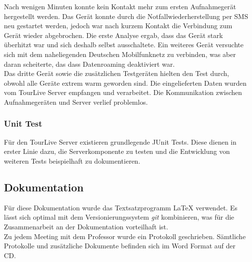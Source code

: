 Nach wenigen Minuten konnte kein Kontakt mehr zum ersten Aufnahmegerät hergestellt werden. Das Gerät konnte durch die Notfallwiederherstellung per SMS neu gestartet werden, jedoch war nach kurzem Kontakt die Verbindung zum Gerät wieder abgebrochen. Die erste Analyse ergab, dass das Gerät stark überhitzt war und sich deshalb selbst ausschaltete. Ein weiteres Gerät versuchte sich mit dem naheliegenden Deutschen Mobilfunknetz zu verbinden, was aber daran scheiterte, das dass Datenroaming deaktiviert war.
\\

Das dritte Gerät sowie die zusätzlichen Testgeräten hielten den Test durch, obwohl alle Geräte extrem warm geworden sind. Die eingelieferten Daten wurden vom TourLive Server empfangen und verarbeitet. Die Kommunikation zwischen Aufnahmegeräten und Server verlief problemlos.

\subsubsection{Unit Test}
Für den TourLive Server existieren grundlegende JUnit Tests. Diese dienen in erster Linie dazu, die Serverkomponente zu testen und die Entwicklung von weiteren Tests beispielhaft zu dokumentieren.

\subsection{Dokumentation}
Für diese Dokumentation wurde das Textsatzprogramm {\LaTeX} verwendet. Es lässt sich optimal mit dem Versionierungssystem \textit{\gls{git}} kombinieren, was für die Zusammenarbeit an der Dokumentation vorteilhaft ist.
\\

Zu jedem Meeting mit dem Professor wurde ein Protokoll geschrieben. Sämtliche Protokolle und zusätzliche Dokumente befinden sich im Word Format auf der CD.